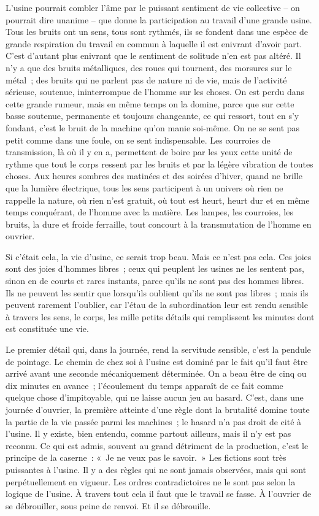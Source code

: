 \documentclass[french,twoside]{book} %
\begin{document}
L'usine pourrait combler l'âme par le puissant sentiment de vie collective – on pourrait dire unanime – que donne la participation au travail d'une grande usine. Tous les bruits ont un sens, tous sont rythmés, ils se fondent dans une espèce de grande respiration du travail en commun à laquelle il est enivrant d'avoir part. C'est d'autant plus enivrant que le sentiment de solitude n'en est pas altéré. Il n'y a que des bruits métalliques, des roues qui tournent, des morsures sur le métal ; des bruits qui ne parlent pas de nature ni de vie, mais de l'activité sérieuse, soutenue, ininterrompue de l'homme sur les choses. On est perdu dans cette grande rumeur, mais en même temps on la domine, parce que sur cette basse soutenue, permanente et toujours changeante, ce qui ressort, tout en s'y fondant, c'est le bruit de la machine qu'on manie soi-même. On ne se sent pas petit comme dans une foule, on se sent indispensable. Les courroies de transmission, là où il y en a, permettent de boire par les yeux cette unité de rythme que tout le corps ressent par les bruits et par la légère vibration de toutes choses. Aux heures sombres des matinées et des soirées d'hiver, quand ne brille que la lumière électrique, tous les sens participent à un univers où rien ne rappelle la nature, où rien n'est gratuit, où tout est heurt, heurt dur et en même temps conquérant, de l'homme avec la matière. Les lampes, les courroies, les bruits, la dure et froide ferraille, tout concourt à la transmutation de l'homme en ouvrier.\par
Si c'était cela, la vie d'usine, ce serait trop beau. Mais ce n'est pas cela. Ces joies sont des joies d'hommes libres ; ceux qui peuplent les usines ne les sentent pas, sinon en de courts et rares instants, parce qu'ils ne sont pas des hommes libres. Ils ne peuvent les sentir que lorsqu'ils oublient qu'ils ne sont pas libres ; mais ils peuvent rarement l'oublier, car l'étau de la subordination leur est rendu sensible à travers les sens, le corps, les mille petits détails qui remplissent les minutes dont est constituée une vie.\par
Le premier détail qui, dans la journée, rend la servitude sensible, c'est la pendule de pointage. Le chemin de chez soi à l'usine est dominé par le fait qu'il faut être arrivé avant une seconde mécaniquement déterminée. On a beau être de cinq ou dix minutes en avance ; l'écoulement du temps apparaît de ce fait comme quelque chose d'impitoyable, qui ne laisse aucun jeu au hasard. C'est, dans une journée d'ouvrier, la première atteinte d'une règle dont la brutalité domine toute la partie de la vie passée parmi les machines ; le hasard n'a pas droit de cité à l'usine. Il y existe, bien entendu, comme partout ailleurs, mais il n'y est pas reconnu. Ce qui est admis, souvent au grand détriment de la production, c'est le principe de la caserne : « Je ne veux pas le savoir. » Les fictions sont très puissantes à l'usine. Il y a des règles qui ne sont jamais observées, mais qui sont perpétuellement en vigueur. Les ordres contradictoires ne le sont pas selon la logique de l'usine. À travers tout cela il faut que le travail se fasse. À l'ouvrier de se débrouiller, sous peine de renvoi. Et il se débrouille.\par
\end{document}
